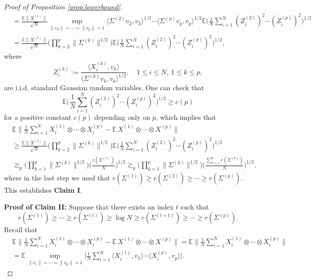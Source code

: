 \documentclass[numbers,webpdf,imaiai]{ima-authoring-template}
\theoremstyle{thmstyletwo}%
\numberwithin{equation}{section}
\numberwithin{equation}{section}
\newcommand{\E}{\mathbb{E}}
\begin{document}
\begin{proof}[Proof of Proposition \ref{prop:lowerbound}]
\begin{align*}
    &=\frac{\E \|X^{(1)}\|}{\sqrt{N}}  \sup_{\|v_2\|= \cdots =\|v_p\|=1} \langle \Sigma^{(2)} v_2,v_2 \rangle^{1/2}\cdots \langle \Sigma^{(p)} v_p,v_p \rangle^{1/2} \E \bigg(\frac{1}{N}\sum_{i=1}^{N} (Z_i^{(2)})^{2} \cdots (Z_i^{(p)})^{2} \bigg)^{1/2}\\
    &=\frac{\E \|X^{(1)}\|}{\sqrt{N}}\bigg(\prod_{k=2}^p\|\Sigma^{(k)}\|^{1 / 2}\bigg)\E \bigg(\frac{1}{N}\sum_{i=1}^{N} (Z_i^{(2)})^{2} \cdots (Z_i^{(p)})^{2} \bigg)^{1/2},
\end{align*}
where
\[
Z^{(k)}_i :=\frac{\langle X^{(k)}_i,v_k \rangle}{\langle \Sigma^{(k)} v_k ,v_k\rangle^{1/2}},\quad 1\le i\le N, \ 1\le k\le p,
\]
are i.i.d. standard Gaussian random variables. One can check that
\[
\E\bigg(\frac{1}{N}\sum_{i=1}^{N} (Z_i^{(2)})^{2} \cdots (Z_i^{(p)})^{2} \bigg)^{1/2}\ge c(p)
\]
for a positive constant $c(p)$ depending only on $p$, which implies that
\begin{align*}
    &\E \bigg\|\frac{1}{N} \sum_{i=1}^N X_i^{(1)} \otimes \cdots \otimes X_i^{(p)}-\E\, X^{(1)} \otimes \cdots \otimes X^{(p)}\bigg\|\\
    &\ge \frac{\E \|X^{(1)}\|}{\sqrt{N}}\bigg(\prod_{k=2}^p\|\Sigma^{(k)}\|^{1 / 2}\bigg)\E \bigg(\frac{1}{N}\sum_{i=1}^{N} (Z_i^{(2)})^{2} \cdots (Z_i^{(p)})^{2} \bigg)^{1/2}\\
    &\gtrsim_p \bigg(\prod_{k=1}^p\|\Sigma^{(k)}\|^{1 / 2}\bigg)\bigg(\frac{r(\Sigma^{(1)})}{N}\bigg)^{1/2}
    \gtrsim_p \bigg(\prod_{k=1}^p\|\Sigma^{(k)}\|^{1 / 2}\bigg)\bigg(\frac{\sum_{k=1}^p r(\Sigma^{(k)})}{N}\bigg)^{1/2},
\end{align*}
where in the last step we used that $r(\Sigma^{(1)})\ge r(\Sigma^{(2)})\ge \cdots\ge r(\Sigma^{(p)})$. This establishes \textbf{Claim I}.

\textbf{Proof of Claim II:}
Suppose that there exists an index $t$ such that 
\[
r(\Sigma^{(1)})\ge \cdots \ge r(\Sigma^{(t)})\ge \log N \ge r(\Sigma^{(t+1)})\ge \cdots \ge r(\Sigma^{(p)}).
\]
Recall that
\begin{align*}
&\E \bigg\|\frac{1}{N} \sum_{i=1}^N X_i^{(1)} \otimes \cdots \otimes X_i^{(p)}-\E\, X^{(1)} \otimes \cdots \otimes X^{(p)}\bigg\|=\E \bigg\|\frac{1}{N} \sum_{i=1}^N X_i^{(1)} \otimes \cdots \otimes X_i^{(p)}\bigg\| \\
&= \E \sup_{\|v_1\|= \cdots =\|v_p\|=1} \bigg| \frac{1}{N}\sum_{i=1}^N \langle X^{(1)}_i,v_1\rangle \cdots \langle X^{(p)}_i, v_p \rangle \bigg|.
\end{align*}
 


\end{proof}
\end{document}
